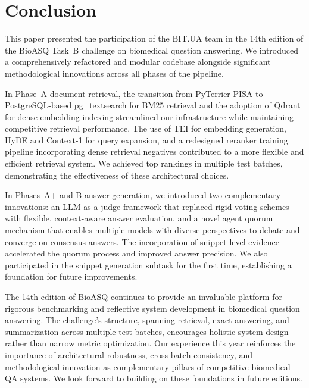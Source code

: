 \section{Conclusion}
\label{sec:conclusion}

This paper presented the participation of the BIT.UA team in the 14th edition of the BioASQ Task~B challenge on biomedical question answering. We introduced a comprehensively refactored and modular codebase alongside significant methodological innovations across all phases of the pipeline.

In Phase~A document retrieval, the transition from PyTerrier PISA to PostgreSQL-based pg\_textsearch for BM25 retrieval and the adoption of Qdrant for dense embedding indexing streamlined our infrastructure while maintaining competitive retrieval performance. The use of TEI for embedding generation, HyDE and Context-1 for query expansion, and a redesigned reranker training pipeline incorporating dense retrieval negatives contributed to a more flexible and efficient retrieval system. We achieved top rankings in multiple test batches, demonstrating the effectiveness of these architectural choices.

In Phases~A+ and B answer generation, we introduced two complementary innovations: an LLM-as-a-judge framework that replaced rigid voting schemes with flexible, context-aware answer evaluation, and a novel agent quorum mechanism that enables multiple models with diverse perspectives to debate and converge on consensus answers. The incorporation of snippet-level evidence accelerated the quorum process and improved answer precision. We also participated in the snippet generation subtask for the first time, establishing a foundation for future improvements.

The 14th edition of BioASQ continues to provide an invaluable platform for rigorous benchmarking and reflective system development in biomedical question answering. The challenge's structure, spanning retrieval, exact answering, and summarization across multiple test batches, encourages holistic system design rather than narrow metric optimization. Our experience this year reinforces the importance of architectural robustness, cross-batch consistency, and methodological innovation as complementary pillars of competitive biomedical QA systems. We look forward to building on these foundations in future editions.

